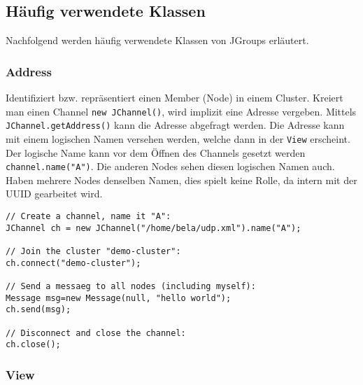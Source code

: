 \subsection{Häufig verwendete Klassen}

Nachfolgend werden häufig verwendete Klassen von JGroups erläutert.

\subsubsection{Address} 

Identifiziert bzw. repräsentiert einen Member (Node) in einem Cluster. Kreiert man einen Channel \verb|new JChannel()|, wird implizit eine Adresse vergeben. Mittels \verb|JChannel.getAddress()| kann die Adresse abgefragt werden. Die Adresse kann mit einem logischen Namen versehen werden, welche dann in der \verb|View| erscheint. Der logische Name kann vor dem Öffnen des Channels gesetzt werden \verb|channel.name("A")|. Die anderen Nodes sehen diesen logischen Namen auch. Haben mehrere Nodes denselben Namen, dies spielt keine Rolle, da intern mit der UUID gearbeitet wird.
	
\begin{lstlisting}
// Create a channel, name it "A":
JChannel ch = new JChannel("/home/bela/udp.xml").name("A");
	
// Join the cluster "demo-cluster":
ch.connect("demo-cluster");
	
// Send a messaeg to all nodes (including myself):
Message msg=new Message(null, "hello world");
ch.send(msg);
	
// Disconnect and close the channel:
ch.close();
\end{lstlisting}
	
\subsubsection{View}

